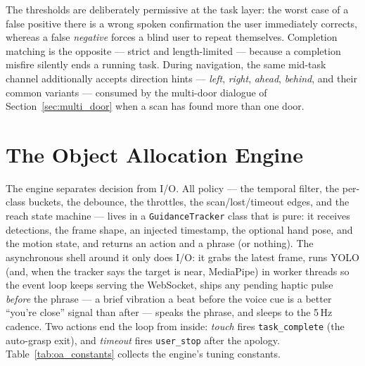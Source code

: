 The thresholds are deliberately permissive at the task layer: the worst case of a
false positive there is a wrong spoken confirmation the user immediately corrects,
whereas a false \emph{negative} forces a blind user to repeat themselves.
Completion matching is the opposite --- strict and length-limited --- because a
completion misfire silently ends a running task. During navigation, the same
mid-task channel additionally accepts direction hints --- \emph{left},
\emph{right}, \emph{ahead}, \emph{behind}, and their common variants --- consumed
by the multi-door dialogue of Section~\ref{sec:multi_door} when a scan has found
more than one door.

\section{The Object Allocation Engine}
\label{sec:oa_engine}

The engine separates decision from I/O. All policy --- the temporal filter, the
per-class buckets, the debounce, the throttles, the scan/lost/timeout edges, and
the reach state machine --- lives in a \texttt{GuidanceTracker} class that is pure:
it receives detections, the frame shape, an injected timestamp, the optional hand
pose, and the motion state, and returns an action and a phrase (or nothing). The
asynchronous shell around it only does I/O: it grabs the latest frame, runs YOLO
(and, when the tracker says the target is near, MediaPipe) in worker threads so
the event loop keeps serving the WebSocket, ships any pending haptic pulse
\emph{before} the phrase --- a brief vibration a beat before the voice cue is a
better ``you're close'' signal than after --- speaks the phrase, and sleeps to the
5\,Hz cadence. Two actions end the loop from inside: \emph{touch} fires
\texttt{task\_complete} (the auto-grasp exit), and \emph{timeout} fires
\texttt{user\_stop} after the apology. Table~\ref{tab:oa_constants} collects the
engine's tuning constants.

